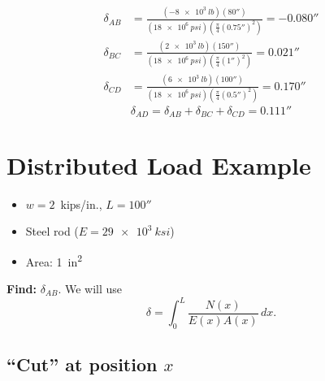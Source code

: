 \documentclass[11pt]{article}
\begin{document}
\begin{align*}
  \delta_{AB} &= \frac{(\SI{-8e3}{lb})(80'')}{(\SI{18e6}{psi})\left(\frac{\pi}{4}(0.75'')^2\right)}
               = -0.080'' \\[4pt]
  \delta_{BC} &= \frac{(\SI{2e3}{lb})(150'')}{(\SI{18e6}{psi})\left(\frac{\pi}{4}(1'')^2\right)}
               = 0.021'' \\[4pt]
  \delta_{CD} &= \frac{(\SI{6e3}{lb})(100'')}{(\SI{18e6}{psi})\left(\frac{\pi}{4}(0.5'')^2\right)}
               = 0.170''
\end{align*}
\[
  \boxed{\delta_{AD} = \delta_{AB} + \delta_{BC} + \delta_{CD} = 0.111''}
\]

\section*{Distributed Load Example}

\noindent
\begin{minipage}[c]{0.5\textwidth}
\centering
{}
\end{minipage}%
\hfill
\begin{minipage}[c]{0.45\textwidth}
\begin{itemize}
  \item $w = 2$~kips/in., $L = 100''$
  \item Steel rod ($E = \SI{29e3}{ksi}$)
  \item Area: \SI{1}{in^2}
\end{itemize}
\textbf{Find:} $\delta_{AB}$. We will use
\[ \delta = \int_0^L \frac{N(x)}{E(x)A(x)}\,dx. \]
\end{minipage}

\subsection*{``Cut'' at position $x$}
\end{document}
